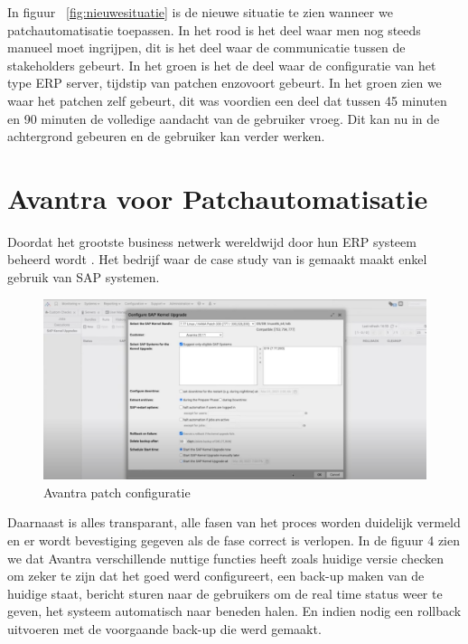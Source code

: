 In figuur ~\ref{fig:nieuwesituatie} is de nieuwe situatie te zien wanneer we patchautomatisatie toepassen. In het rood is het deel waar men nog steeds manueel moet ingrijpen, dit is het deel waar de communicatie tussen de stakeholders gebeurt. In het groen is het de deel waar de configuratie van het type ERP server, tijdstip van patchen enzovoort gebeurt. In het groen zien we waar het patchen zelf gebeurt, dit was voordien een deel dat tussen 45 minuten en 90 minuten de volledige aandacht van de gebruiker vroeg. Dit kan nu in de achtergrond gebeuren en de gebruiker kan verder werken. \\


\section{Avantra voor Patchautomatisatie}
Doordat het grootste business netwerk wereldwijd door hun ERP systeem beheerd wordt \autocite{Laborde2024}. Het bedrijf waar de case study van is gemaakt maakt enkel gebruik van SAP systemen.


\begin{figure}[htbp]
    \centering
    \includegraphics[width=\textwidth]{avantra1.png}
    \caption{Avantra patch configuratie}
     \label{fig:avantra1}
\end{figure}

Daarnaast is alles transparant, alle fasen van het proces worden duidelijk vermeld en er wordt bevestiging gegeven als de fase correct is verlopen. In de figuur 4 zien we dat Avantra verschillende
nuttige functies heeft zoals huidige versie checken om zeker te zijn dat het goed werd configureert, een back-up maken van de huidige staat, bericht sturen naar de gebruikers om de real time status weer
   te geven, het systeem automatisch naar beneden halen. En indien nodig een rollback uitvoeren met de voorgaande back-up die werd gemaakt.

